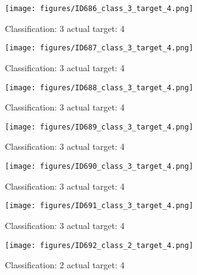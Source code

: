 \begin{figure}[h!]
\begin{center}
\texttt{[image: figures/ID686\_class\_3\_target\_4.png]}
\end{center}
\caption{ Classification: 3 actual target: 4}
\label{fig:ID686_class_3_target_4}
\end{figure}
\begin{figure}[h!]
\begin{center}
\texttt{[image: figures/ID687\_class\_3\_target\_4.png]}
\end{center}
\caption{ Classification: 3 actual target: 4}
\label{fig:ID687_class_3_target_4}
\end{figure}
\begin{figure}[h!]
\begin{center}
\texttt{[image: figures/ID688\_class\_3\_target\_4.png]}
\end{center}
\caption{ Classification: 3 actual target: 4}
\label{fig:ID688_class_3_target_4}
\end{figure}
\begin{figure}[h!]
\begin{center}
\texttt{[image: figures/ID689\_class\_3\_target\_4.png]}
\end{center}
\caption{ Classification: 3 actual target: 4}
\label{fig:ID689_class_3_target_4}
\end{figure}
\begin{figure}[h!]
\begin{center}
\texttt{[image: figures/ID690\_class\_3\_target\_4.png]}
\end{center}
\caption{ Classification: 3 actual target: 4}
\label{fig:ID690_class_3_target_4}
\end{figure}
\begin{figure}[h!]
\begin{center}
\texttt{[image: figures/ID691\_class\_3\_target\_4.png]}
\end{center}
\caption{ Classification: 3 actual target: 4}
\label{fig:ID691_class_3_target_4}
\end{figure}
\begin{figure}[h!]
\begin{center}
\texttt{[image: figures/ID692\_class\_2\_target\_4.png]}
\end{center}
\caption{ Classification: 2 actual target: 4}
\label{fig:ID692_class_2_target_4}
\end{figure}
